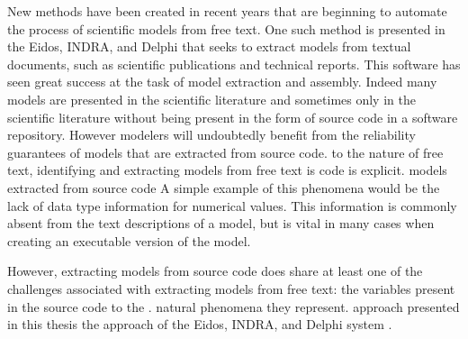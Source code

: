 New methods have been created in recent years that are beginning to automate the process of  %
scientific models from free text. One such method is presented in the Eidos, INDRA, and Delphi  \cite{EidosIndraDelphi}  %
that seeks to extract models from textual documents, such as scientific publications and technical reports. This software has seen great success at the task of model extraction and assembly. Indeed many models are presented in the scientific literature and sometimes only in the scientific literature without being present in the form of source code in a software repository. However modelers will undoubtedly benefit from the reliability guarantees of models that are extracted from source code. 
 to the nature of free text, identifying and extracting models from free text is 
 code  is explicit. 
models extracted from source code  %
A simple example of this phenomena would be the lack of data type information for numerical values. This information is commonly absent from the text descriptions of a model, but is vital in many cases when creating an executable version of the model. 

However, extracting models from source code does share at least one of the challenges associated with extracting models from free text:
 the variables present in the source code to the .
natural phenomena they represent. 
 approach presented in this thesis 
 the approach of the Eidos, INDRA, and Delphi system .

